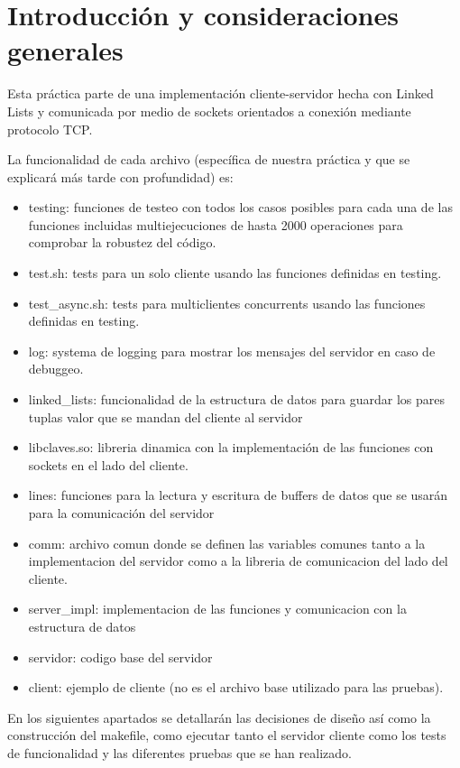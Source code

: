 \section{Introducción y consideraciones generales}

Esta práctica parte de una implementación cliente-servidor hecha con Linked Lists y comunicada por medio de sockets orientados a conexión mediante protocolo TCP. 

La funcionalidad de cada archivo (específica de nuestra práctica y que se explicará más tarde con profundidad) es:
\begin{itemize}
    \item testing: funciones de testeo con todos los casos posibles para cada una de las funciones incluidas multiejecuciones de hasta 2000 operaciones para comprobar la robustez del código.
    \item test.sh: tests para un solo cliente usando las funciones definidas en testing.
    \item test\_async.sh: tests para multiclientes concurrents usando las funciones definidas en testing. 
    \item log: systema de logging para mostrar los mensajes del servidor en caso de debuggeo.
    \item linked\_lists: funcionalidad de la estructura de datos para guardar los pares tuplas valor que se mandan del cliente al servidor
    \item libclaves.so: libreria dinamica con la implementación de las funciones con sockets en el lado del cliente.
    \item lines: funciones para la lectura y escritura de buffers de datos que se usarán para la comunicación del servidor
    \item comm: archivo comun donde se definen las variables comunes tanto a la implementacion del servidor como a la libreria de comunicacion del lado del cliente.
    \item server\_impl: implementacion de las funciones y comunicacion con la estructura de datos
    \item servidor: codigo base del servidor
    \item client: ejemplo de cliente (no es el archivo base utilizado para las pruebas).
\end{itemize}

En los siguientes apartados se detallarán las decisiones de diseño así como la construcción del makefile, como ejecutar tanto el servidor cliente como los tests de funcionalidad y las diferentes pruebas que se han realizado.